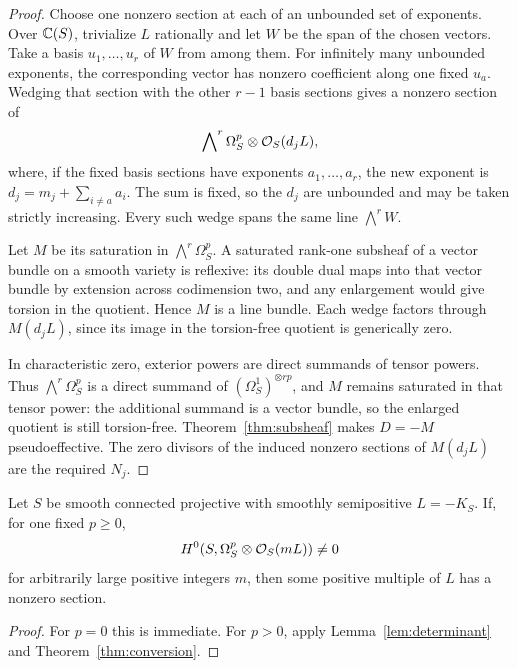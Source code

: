 \begin{proof}
Choose one nonzero section at each of an unbounded set of exponents.
Over \(\mathbb C(S)\), trivialize \(L\) rationally and let \(W\) be the
span of the chosen vectors. Take a basis \(u_1,\ldots,u_r\) of \(W\)
from among them. For infinitely many unbounded exponents, the corresponding
vector has nonzero coefficient along one fixed \(u_a\). Wedging that
section with the other \(r-1\) basis sections gives a nonzero section
of
\[
\bigwedge\nolimits^r\Omega_S^p\otimes\mathcal O_S(d_jL),
\]
where, if the fixed basis sections have exponents \(a_1,\ldots,a_r\),
the new exponent is \(d_j=m_j+\sum_{i\ne a}a_i\).
The sum is fixed, so the \(d_j\) are unbounded and may be taken strictly increasing.
Every such wedge spans the same line \(\bigwedge^r W\).

Let \(M\) be its saturation in \(\bigwedge^r\Omega_S^p\).
A saturated rank-one subsheaf of a vector bundle on a smooth variety
is reflexive: its double dual maps into that vector bundle by extension
across codimension two, and any enlargement would give torsion in the
quotient. Hence \(M\) is a line bundle. Each wedge factors through
\(M(d_jL)\), since its image in the torsion-free quotient is generically
zero.

In characteristic zero, exterior powers are direct summands of tensor
powers. Thus \(\bigwedge^r\Omega_S^p\) is a direct summand of
\((\Omega_S^1)^{\otimes rp}\), and \(M\) remains saturated in that
tensor power: the additional summand is a vector bundle, so the enlarged
quotient is still torsion-free. Theorem~\ref{thm:subsheaf} makes \(D=-M\)
pseudoeffective. The zero divisors of the induced nonzero sections of
\(M(d_jL)\) are the required \(N_j\).
\end{proof}

\begin{corollary}\label{cor:conversion}
Let \(S\) be smooth connected projective with smoothly semipositive
\(L=-K_S\). If, for one fixed \(p\ge0\),
\[
H^0(S,\Omega_S^p\otimes\mathcal O_S(mL))\ne0
\]
for arbitrarily large positive integers \(m\), then some positive
multiple of \(L\) has a nonzero section.
\end{corollary}

\begin{proof}
For \(p=0\) this is immediate. For \(p>0\), apply
Lemma~\ref{lem:determinant} and Theorem~\ref{thm:conversion}.
\end{proof}
